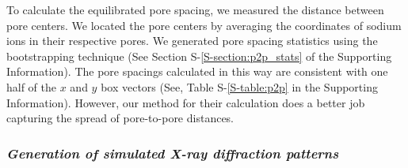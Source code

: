 \documentclass[journal=jpcbfk,manuscript=article]{achemso}
\begin{document}
  To calculate the equilibrated pore spacing, we measured the distance between
  pore centers. We located the pore centers by averaging the coordinates of sodium
  ions in their respective pores. We generated pore spacing statistics 
  using the bootstrapping technique (See Section S-\ref{S-section:p2p_stats} of the
  Supporting Information). 
  The pore spacings calculated in this way are consistent
  with one half of the $x$ and $y$ box vectors (See, Table S-\ref{S-table:p2p} in the
  Supporting Information). However, our method for their calculation does a better 
  job capturing the spread of pore-to-pore distances.

%

  \subsubsection{\textit{Generation of simulated X-ray diffraction patterns}}\label{method:xrd}
  
\end{document}
